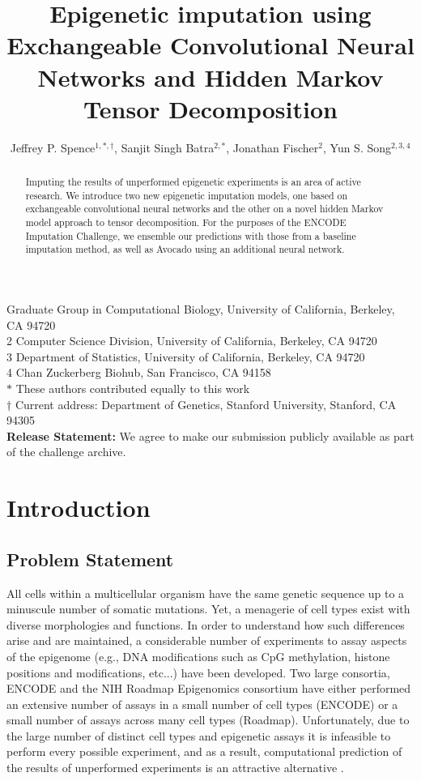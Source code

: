 \documentclass[11pt]{article}
\title{Epigenetic imputation using Exchangeable Convolutional Neural Networks and Hidden Markov Tensor Decomposition}
\author{Jeffrey P. Spence$^{1,\ast,\dagger}$, Sanjit Singh Batra$^{2,\ast}$, Jonathan Fischer$^2$, Yun S. Song$^{2,3,4}$}
\begin{document}
\maketitle

 Graduate Group in Computational Biology, University of California, Berkeley, CA 94720 \\
2 Computer Science Division, University of California, Berkeley, CA 94720 \\
3 Department of Statistics, University of California, Berkeley, CA 94720 \\
4 Chan Zuckerberg Biohub, San Francisco, CA 94158 \\
$\ast$ These authors contributed equally to this work\\
$\dagger$ Current address: Department of Genetics, Stanford University, Stanford, CA 94305\\

\bigskip
\bigskip
\noindent \textbf{Release Statement:} We agree to make our submission publicly available as part of the challenge archive.
\bigskip
\bigskip
\begin{abstract}
Imputing the results of unperformed epigenetic experiments is an area of active research. We introduce two new epigenetic imputation models, one based on exchangeable convolutional neural networks \cite{zaheer2017deep,ravanbakhsh2017equivariance,chan2018likelihood} and the other on a novel hidden Markov model approach to tensor decomposition. For the purposes of the ENCODE Imputation Challenge, we ensemble our predictions with those from a baseline imputation method, as well as Avocado \cite{schreiber2019multi} using an additional neural network.
\end{abstract}

\section{Introduction}

\subsection{Problem Statement}
All cells within a multicellular organism have the same genetic sequence up to a minuscule number of somatic mutations. Yet, a menagerie of cell types exist with diverse morphologies and functions. In order to understand how such differences arise and are maintained, a considerable number of experiments to assay aspects of the epigenome (e.g., DNA modifications such as CpG methylation, histone positions and modifications, etc...) have been developed. Two large consortia, ENCODE \cite{encode2012integrated} and the NIH Roadmap Epigenomics consortium \cite{roadmap2015integrative} have either performed an extensive number of assays in a small number of cell types (ENCODE) or a small number of assays across many cell types (Roadmap). Unfortunately, due to the large number of distinct cell types and epigenetic assays it is infeasible to perform every possible experiment, and as a result, computational prediction of the results of unperformed experiments is an attractive alternative \cite{ernst2015large,durham2018predictd, schreiber2019multi}.
\end{document}
